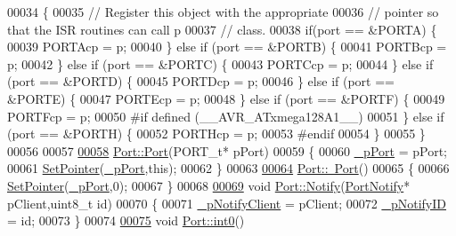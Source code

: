 \begin{DoxyCode}
00034 \{
00035     \textcolor{comment}{// Register this object with the appropriate}
00036     \textcolor{comment}{// pointer so that the ISR routines can call p}
00037     \textcolor{comment}{// class.}
00038     \textcolor{keywordflow}{if}(port == &PORTA) \{
00039         PORTAcp = p;
00040     \} \textcolor{keywordflow}{else} \textcolor{keywordflow}{if} (port == &PORTB) \{
00041         PORTBcp = p;
00042     \} \textcolor{keywordflow}{else} \textcolor{keywordflow}{if} (port ==  &PORTC) \{
00043         PORTCcp = p;
00044     \} \textcolor{keywordflow}{else} \textcolor{keywordflow}{if} (port ==  &PORTD) \{
00045         PORTDcp = p;
00046     \} \textcolor{keywordflow}{else} \textcolor{keywordflow}{if} (port ==  &PORTE) \{
00047         PORTEcp = p;
00048     \} \textcolor{keywordflow}{else} \textcolor{keywordflow}{if} (port ==  &PORTF) \{
00049         PORTFcp = p;
00050 \textcolor{preprocessor}{#if defined (\_\_AVR\_ATxmega128A1\_\_)}
00051 \textcolor{preprocessor}{}    \} \textcolor{keywordflow}{else} \textcolor{keywordflow}{if} (port ==  &PORTH) \{
00052         PORTHcp = p;
00053 \textcolor{preprocessor}{#endif}
00054 \textcolor{preprocessor}{}    \}
00055 \}
00056 
00057 
\hypertarget{_port_8cpp_source_l00058}{}\hyperlink{class_port_a6f90240a1d5bb00b7cb0284134ba3dfc}{00058} \hyperlink{class_port_a6f90240a1d5bb00b7cb0284134ba3dfc}{Port::Port}(PORT\_t* pPort)
00059 \{
00060     \hyperlink{class_port_a1475caa8ec2e667350eae96d4b7a28ac}{_pPort} = pPort;
00061     \hyperlink{_port_8cpp_afaf5d589e6cb241cd3822efd8c9cbb05}{SetPointer}(\hyperlink{class_port_a1475caa8ec2e667350eae96d4b7a28ac}{_pPort},\textcolor{keyword}{this});
00062 \}
00063 
\hypertarget{_port_8cpp_source_l00064}{}\hyperlink{class_port_afe166c2a6b10ad34d47472a150366bc1}{00064} \hyperlink{class_port_afe166c2a6b10ad34d47472a150366bc1}{Port::~Port}()
00065 \{
00066     \hyperlink{_port_8cpp_afaf5d589e6cb241cd3822efd8c9cbb05}{SetPointer}(\hyperlink{class_port_a1475caa8ec2e667350eae96d4b7a28ac}{_pPort},0);
00067 \}
00068 
\hypertarget{_port_8cpp_source_l00069}{}\hyperlink{class_port_a8dd6215565362d65fd4ef159b7b8dc95}{00069} \textcolor{keywordtype}{void} \hyperlink{class_port_a8dd6215565362d65fd4ef159b7b8dc95}{Port::Notify}(\hyperlink{class_port_notify}{PortNotify}* pClient,uint8\_t \textcolor{keywordtype}{id})
00070 \{
00071     \hyperlink{class_port_ac939fdc751f6e01ce4afcdf97f4598f9}{_pNotifyClient}  = pClient;
00072     \hyperlink{class_port_ac1dae0f3300d4fc57f16f8b548b0e9d7}{_pNotifyID}      = id;
00073 \}
00074 
\hypertarget{_port_8cpp_source_l00075}{}\hyperlink{class_port_ab9841b306c73a2b7a1a7a141da222808}{00075} \textcolor{keywordtype}{void} \hyperlink{class_port_ab9841b306c73a2b7a1a7a141da222808}{Port::int0}()

\end{DoxyCode}
